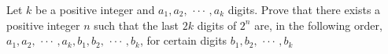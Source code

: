 Let $k$ be a positive integer and $a_1, a_2,$ $\cdot \cdot \cdot$ $, a_k$ digits. Prove that there exists a positive integer $n$ such that the last $2k$ digits of $2^n$ are, in the following order, $a_1, a_2,$ $\cdot \cdot \cdot$ $, a_k , b_1, b_2,$ $\cdot \cdot \cdot$ $, b_k$,  for certain digits $b_1, b_2,$ $\cdot \cdot \cdot$ $, b_k$